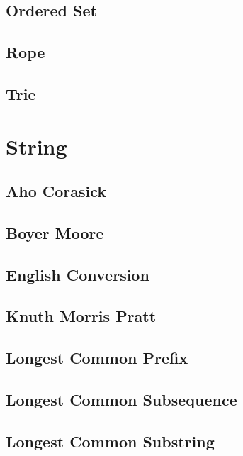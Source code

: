 \documentclass[landscape, 10pt]{article}
\begin{document}
\begin{multicols}{4}
\subsection{Ordered Set}

\subsection{Rope}

\subsection{Trie}


\section{String}
\subsection{Aho Corasick}

\subsection{Boyer Moore}

\subsection{English Conversion}

\subsection{Knuth Morris Pratt}

\subsection{Longest Common Prefix}

\subsection{Longest Common Subsequence}

\subsection{Longest Common Substring}


\end{multicols}
\end{document}
